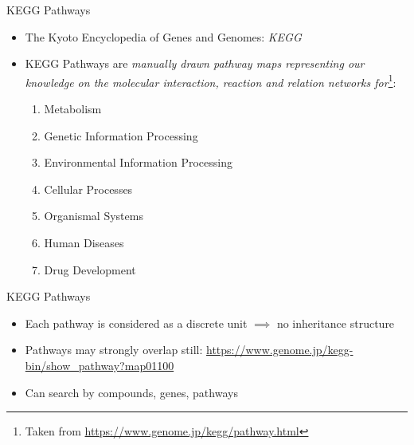 \documentclass[aspectratio=169,11pt]{beamer}
\begin{document}

\begin{frame}{KEGG Pathways}

	\begin{itemize}
		\item The Kyoto Encyclopedia of Genes and Genomes: \textit{KEGG}
		\item KEGG Pathways are \textit{manually drawn pathway maps representing our knowledge on the molecular interaction, reaction and relation networks for}\footnote{Taken from \url{https://www.genome.jp/kegg/pathway.html}}:
		\begin{enumerate}
			\item Metabolism
			\item Genetic Information Processing
			\item Environmental Information Processing
			\item Cellular Processes
			\item Organismal Systems
			\item Human Diseases
			\item Drug Development
		\end{enumerate}
	\end{itemize}

\end{frame}

\begin{frame}{KEGG Pathways}

	\begin{itemize}
		\item Each pathway is considered as a discrete unit $\implies$ no inheritance structure
		\item Pathways may strongly overlap still: \url{https://www.genome.jp/kegg-bin/show_pathway?map01100}
		\item Can search by compounds, genes, pathways
	\end{itemize}
	
	
\end{frame}
\end{document}
